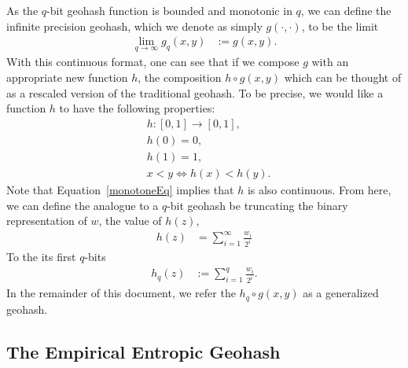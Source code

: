 \documentclass{article} %
\begin{document}
As the $q$-bit geohash function is bounded and monotonic in $q$, we can define the infinite
precision geohash, which we denote as simply $g(\cdot, \cdot)$, to be the limit
\begin{align}
\lim_{q \rightarrow \infty} g_q(x,y) &:= g(x,y).
\end{align}
With this continuous format, one can see that if we compose $g$ with an appropriate new function
$h$, the composition $h \circ g(x,y)$ which can be thought of as a rescaled version of the
traditional geohash. To be precise, we would like a function $h$ to have the following properties:
\begin{align}
&h: [0,1] \rightarrow [0,1], \label{hDef} \\
&h(0) = 0, \\
&h(1) = 1, \\
&x < y \iff h(x) < h(y). \label{monotoneEq}
\end{align}
Note that Equation~\ref{monotoneEq} implies that $h$ is also continuous. From here, we can define
the analogue to a $q$-bit geohash be truncating the binary representation of $w$, the value of
$h(z)$,
\begin{align}
h(z) &= \sum_{i=1}^{\infty} \frac{w_i}{2^i}
\end{align}
To the its first $q$-bits
\begin{align}
h_q(z) &:= \sum_{i=1}^{q} \frac{w_i}{2^i}.
\end{align}
In the remainder of this document, we refer the $h_q \circ g(x,y)$ as a generalized geohash.

\subsection{The Empirical Entropic Geohash}
\end{document}
